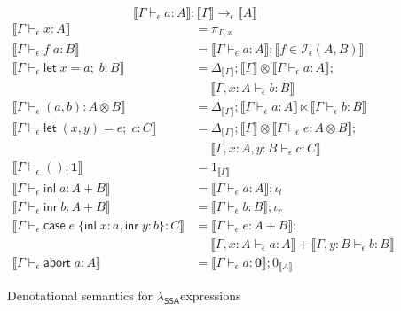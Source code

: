 \documentclass[acmsmall,screen,review]{acmart}
\newcommand{\mc}[1]{\ensuremath{\mathcal{#1}}}
\newcommand{\mb}[1]{\ensuremath{\mathbf{#1}}}
\newcommand{\ms}[1]{\ensuremath{\mathsf{#1}}}
\newcommand{\lto}{:}
\newcommand{\linl}[1]{\ms{inl}\;{#1}}
\newcommand{\linr}[1]{\ms{inr}\;{#1}}
\newcommand{\labort}[1]{\ms{abort}\;{#1}}
\newcommand{\letexpr}[3]{\ensuremath{\ms{let}\;#1 = #2;\;#3}}
\newcommand{\caseexpr}[5]{\ms{case}\;#1\;\{\linl{#2} \lto #3, \linr{#4} \lto #5\}}
\newcommand{\bhyp}[2]{#1 : #2}
\newcommand{\hasty}[4]{#1 \vdash_{#2} #3: {#4}}
\newcommand{\isop}[4]{#1 \in \mc{I}_{#4}(#2, #3)}
\newcommand{\dnt}[1]{\llbracket{#1}\rrbracket}
\newcommand{\isotopessa}{\(\lambda_{\ms{SSA}}\)}
\begin{document}
\begin{figure}
  \begin{equation*}
    \boxed{\dnt{\hasty{\Gamma}{\epsilon}{a}{A}} : \dnt{\Gamma} \to_\epsilon \dnt{A}}
  \end{equation*}
  \begin{align*}
    \dnt{\hasty{\Gamma}{\epsilon}{x}{A}} &= \pi_{\Gamma, x} \\
    \dnt{\hasty{\Gamma}{\epsilon}{f\;a}{B}} 
      &= \dnt{\hasty{\Gamma}{\epsilon}{a}{A}} ; \dnt{\isop{f}{A}{B}{\epsilon}} \\
    \dnt{\hasty{\Gamma}{\epsilon}{\letexpr{x}{a}{b}}{B}}
      &= \Delta_{\dnt{\Gamma}}
      ; \dnt{\Gamma} \otimes \dnt{\hasty{\Gamma}{\epsilon}{a}{A}};
      \\&\quad\; 
      \dnt{\hasty{\Gamma, \bhyp{x}{A}}{\epsilon}{b}{B}}
      \\
    \dnt{\hasty{\Gamma}{\epsilon}{(a, b)}{A \otimes B}} 
      &= \Delta_{\dnt{\Gamma}}
      ; \dnt{\hasty{\Gamma}{\epsilon}{a}{A}} \ltimes \dnt{\hasty{\Gamma}{\epsilon}{b}{B}}
      \\
    \dnt{\hasty{\Gamma}{\epsilon}{\letexpr{(x, y)}{e}{c}}{C}}
      &= \Delta_{\dnt{\Gamma}}
      ; \dnt{\Gamma} \otimes \dnt{\hasty{\Gamma}{\epsilon}{e}{A \otimes B}} ;
      \\&\quad\; 
      \dnt{\hasty{\Gamma, \bhyp{x}{A}, \bhyp{y}{B}}{\epsilon}{c}{C}}
      \\
    \dnt{\hasty{\Gamma}{\epsilon}{()}{\mb{1}}} &= 1_{\dnt{\Gamma}} \\
    \dnt{\hasty{\Gamma}{\epsilon}{\linl{a}}{A + B}}
      &= \dnt{\hasty{\Gamma}{\epsilon}{a}{A}} ; \iota_l \\
    \dnt{\hasty{\Gamma}{\epsilon}{\linr{b}}{A + B}}
      &= \dnt{\hasty{\Gamma}{\epsilon}{b}{B}} ; \iota_r \\
    \dnt{\hasty{\Gamma}{\epsilon}{\caseexpr{e}{x}{a}{y}{b}}{C}}
      &= \dnt{\hasty{\Gamma}{\epsilon}{e}{A + B}}
      ; \\& \quad\; 
      \dnt{\hasty{\Gamma, \bhyp{x}{A}}{\epsilon}{a}{A}}
      + \dnt{\hasty{\Gamma, \bhyp{y}{B}}{\epsilon}{b}{B}}
      \\
    \dnt{\hasty{\Gamma}{\epsilon}{\labort{a}}{A}} 
      &= \dnt{\hasty{\Gamma}{\epsilon}{a}{\mb{0}}} ; 0_{\dnt{A}}
  \end{align*}
  \caption{Denotational semantics for \isotopessa expressions}
  \label{fig:ssa-expr-sem}
\end{figure}
\end{document}
